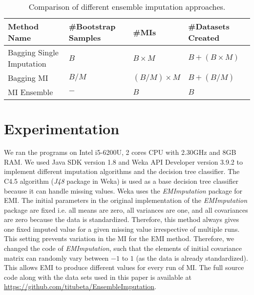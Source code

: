 \documentclass{iosart2c}
\begin{document}
\begin{table*}
\centering
    \caption{Comparison of different ensemble imputation approaches.}
    \label{tab:bmiOP}
    \begin{tabular}{|l|l|l|l|}\hline
    \textbf{Method Name} & \textbf{\#Bootstrap Samples} & \textbf{\#MIs} & \textbf{\#Datasets Created}\\ \hline
    Bagging Single Imputation & $B$ & $B\times M$ & $B+(B\times M)$\\ \hline  
    Bagging MI & $B/M$ & $(B/M) \times M$ & $B+(B/M)$ \\ \hline
    MI Ensemble & $-$ & $B$ & $B$ \\ \hline
    \end{tabular}
\end{table*}

\section{Experimentation}
\label{sec:results}

We ran the programs on Intel i5-6200U, 2 cores CPU with 2.30GHz and 8GB RAM. We used Java SDK version 1.8 and Weka API Developer version 3.9.2 \cite{hall2009weka} to implement different imputation algorithms and the decision tree classifier. The C4.5 algorithm (\textit{J48} package in Weka) is used as a base decision tree classifier because it can handle missing values. Weka uses the \textit{EMImputation} package for EMI. The initial parameters in the original implementation of the \textit{EMImputation} package are fixed i.e. all means are zero, all variances are one, and all covariances are zero because the data is standardized. Therefore, this method always gives one fixed imputed value for a given missing value irrespective of multiple runs. This setting prevents variation in the MI for the EMI method. Therefore, we changed the code of \textit{EMImputation}, such that the elements of initial covariance matrix can randomly vary between $-1$ to $1$ (as the data is already standardized). This allows EMI to produce different values for every run of MI. The full source code along with the data sets used in this paper is available at \url{https://github.com/titubeta/EnsembleImputation}.
\end{document}
